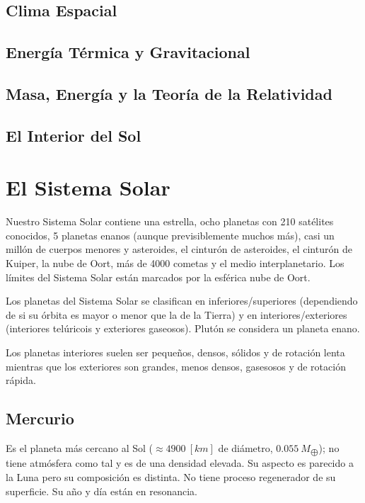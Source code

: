 \documentclass{tufte-handout}
\begin{document}
\subsection{Clima Espacial}

\subsection{Energía Térmica y Gravitacional}

\subsection{Masa, Energía y la Teoría de la Relatividad}

\subsection{El Interior del Sol}

\clearpage

\section{El Sistema Solar}

Nuestro Sistema Solar contiene una estrella, ocho planetas con 210 satélites conocidos, 5 planetas enanos (aunque previsiblemente muchos más), casi un millón de cuerpos menores y asteroides, el cinturón de asteroides, el cinturón de Kuiper, la nube de Oort, más de 4000 cometas y el medio interplanetario. Los límites del Sistema Solar están marcados por la esférica nube de Oort.

Los planetas del Sistema Solar se clasifican en inferiores/superiores (dependiendo de si su órbita es mayor o menor que la de la Tierra) y en interiores/exteriores (interiores telúricois y exteriores gaseosos). Plutón se considera un planeta enano.

Los planetas interiores suelen ser pequeños, densos, sólidos y de rotación lenta mientras que los exteriores son grandes, menos densos, gasesosos y de rotación rápida.

\subsection{Mercurio}

Es el planeta más cercano al Sol ($\approx 4900~[km]$ de diámetro, $0.055~M_{\bigoplus}$); no tiene atmósfera como tal y es de una densidad elevada. Su aspecto es parecido a la Luna pero su composición es distinta. No tiene proceso regenerador de su superficie. Su año y día están en resonancia.
\end{document}
